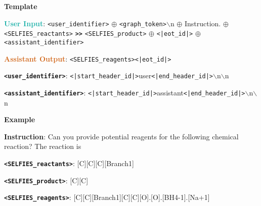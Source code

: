 \begin{tcolorbox}[colback=white!98!black,colframe=white!30!black,boxsep=1.1pt,top=6.75pt]%
\scriptsize
\noindent\makebox[\textwidth]{\rule{\textwidth}{1pt}}
\textbf{Template}
\\[-0.575em]
\noindent\makebox[\textwidth]{\rule{\textwidth}{1pt}}

\textbf{\textcolor[HTML]{20B2AA}{User Input}}: {\tt <user\_identifier>} $\oplus$ {\tt <graph\_token>}$\backslash$n $\oplus$ Instruction. $\oplus$ {\tt <SELFIES\_reactants>} {\tt \textbf{>>}} {\tt <SELFIES\_product>} $\oplus$ {\tt <|eot\_id|>} $\oplus$ {\tt <assistant\_identifier>}

\textbf{\textcolor[HTML]{D2691E}{Assistant Output}}: {\tt <SELFIES\_reagents>}{\tt <|eot\_id|>}

{\tt \textbf{<user\_identifier>}}: {\tt <|start\_header\_id|>}user{\tt <|end\_header\_id|>}$\backslash$n$\backslash$n

{\tt \textbf{<assistant\_identifier>}}: {\tt <|start\_header\_id|>}assistant{\tt <|end\_header\_id|>}$\backslash$n$\backslash$n

\noindent\makebox[\textwidth]{\rule{\textwidth}{1pt}}
\textbf{Example}
\\[-0.575em]
\noindent\makebox[\textwidth]{\rule{\textwidth}{1pt}}

\begin{tcolorbox}[colback=cyan!7!white,colframe=white!98!black,boxsep=1.1pt,top=6.75pt]
\textbf{Instruction}: Can you provide potential reagents for the following chemical reaction? The reaction is

{\tt \textbf{<SELFIES\_reactants>}}: [C][C][C][Branch1]\-[\#C][C][=C][C][=N][C][Branch1][Ring1][O][C][=C][Ring1]\-[Branch2][C][=O][O][C][C][C][O][Ring1][S]

{\tt \textbf{<SELFIES\_product>}}: [C][C]\-[C][Branch1][\#C][C][=C][C][=N][C][Branch1][Ring1][O][C][=C][Ring1]\-[Branch2][C][O][O][C][C][C][O][Ring1]\-[S]

\end{tcolorbox}

\begin{tcolorbox}[colback=orange!7!white,colframe=white!98!black,boxsep=1.1pt,top=6.75pt]
{\tt \textbf{<SELFIES\_reagents>}}: [C][C][Branch1][C][C][O].[O].[BH4-1].[Na+1]
\end{tcolorbox}

\end{tcolorbox}

